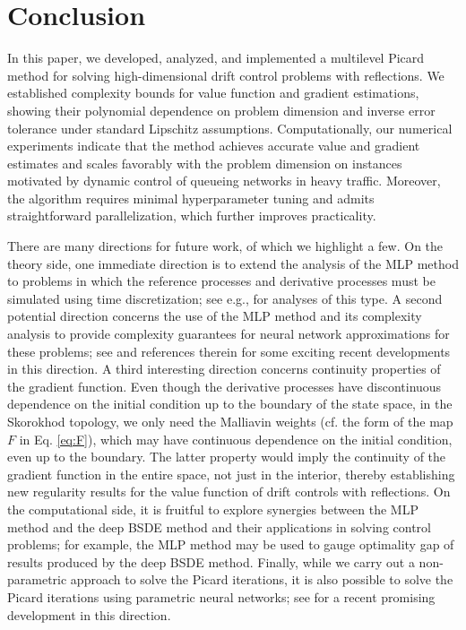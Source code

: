 \documentclass[11pt]{article}
\theoremstyle{definition}
\theoremstyle{plain}
\begin{document}
\section{Conclusion}\label{sec:conclusion}
In this paper, we developed, analyzed, and implemented a multilevel Picard method for solving high-dimensional drift control problems with reflections. 
We established complexity bounds for value function and gradient estimations, 
showing their polynomial dependence on problem dimension and inverse error tolerance under standard Lipschitz assumptions. 
Computationally, our numerical experiments indicate that the method achieves accurate value and gradient estimates 
and scales favorably with the problem dimension on instances motivated by dynamic control of queueing networks in heavy traffic. 
Moreover, the algorithm requires minimal hyperparameter tuning and admits straightforward parallelization, 
which further improves practicality.

There are many directions for future work, of which we highlight a few. On the theory side, 
one immediate direction is to extend the analysis of the MLP method to problems in which 
the reference processes and derivative processes must be simulated using time discretization; 
see e.g., \cite{NeufeldNguyenWu2025,NeufeldWu2025} for analyses of this type. 
A second potential direction concerns the use of the MLP method and its complexity analysis to 
provide complexity guarantees for neural network approximations for these problems; 
see \cite{NeufeldNguyen2024Rectified} and references therein for some exciting recent developments in this direction.
A third interesting direction concerns continuity properties of the gradient function. 
Even though the derivative processes have discontinuous dependence on the initial condition  
up to the boundary of the state space, in the Skorokhod topology, we only need the Malliavin weights (cf. the form of the map $F$ in Eq. \eqref{eq:F}), 
which may have continuous dependence on the initial condition, even up to the boundary. 
The latter property would imply the continuity of the gradient function in the entire space, not just in the interior, 
thereby establishing new regularity results for the value function of drift controls with reflections.  
On the computational side, it is fruitful to explore synergies between the MLP method 
and the deep BSDE method and their applications in solving control problems; for example, the MLP method 
may be used to gauge optimality gap of results produced by the deep BSDE method. 
Finally, while we carry out a non-parametric approach to solve the Picard iterations, 
it is also possible to solve the Picard iterations using parametric neural networks; 
see \cite{HanHuLongZhao2024} for a recent promising development in this direction. 
\end{document}
